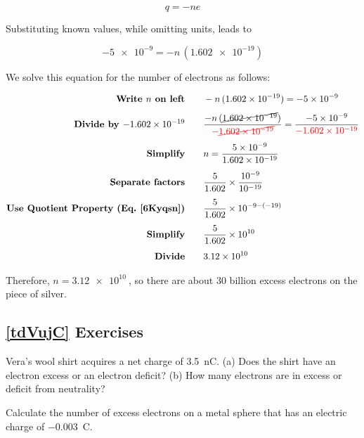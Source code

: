\documentclass[main.tex]{subfiles}
\begin{document}
\begin{equation*}
    q = -ne
\end{equation*}

Substituting known values, while omitting units, leads to

\begin{equation*}
     \num{-5e-9} = - n\,(\num{1.602e-19})
\end{equation*}

We solve this equation for the number of electrons as follows:

\begin{align*}
    \textbf{Write $n$ on left} \qquad & - n\,(\SI{1.602e-19}{}) = \SI{-5e-9}{}\\[1ex]
    \textbf{Divide by \SI{-1.602e-19}{}} \qquad & \frac{- n\,(\cancel{\SI{1.602e-19}{}})}{\mathbin{\color{red} -} \textcolor{red}{\cancel{\SI{1.602e-19}{}}}} = \frac{\SI{-5e-9}{}}{\mathbin{\color{red} -} \textcolor{red}{\SI{1.602e-19}{}}}\\[1ex]
    \textbf{Simplify} \qquad & n = \frac{\qty{5e-9}{}}{\qty{1.602e-19}{}}\\[1ex]
    \textbf{Separate factors} \qquad & \frac{5}{1.602} \times \frac{10^{-9}}{10^{-19}}\\[1ex]
    \textbf{Use Quotient Property (Eq.~\ref{6Kyqsn})} \qquad & \frac{5}{1.602} \times 10^{-9 - (-19)}\\[1ex]
    \textbf{Simplify} \qquad & \frac{5}{1.602} \times 10^{10}\\[1ex]
    \textbf{Divide} \qquad & \SI{3.12e10}{}
\end{align*}

Therefore, $n = \SI{3.12e10}{}$, so there are about 30 billion excess electrons on the piece of silver.

\vspace{1em}
\cyanhrule

\subsection*{\ref{tdVujC} Exercises}

\begin{exercise} \label{994stj}
    Vera's wool shirt acquires a net charge of \SI{3.5}{nC}. (a) Does the shirt have an electron excess or an electron deficit? (b) How many electrons are in excess or deficit from neutrality?
\end{exercise}

\begin{exercise} \label{IRX4Zr}
    Calculate the number of excess electrons on a metal sphere that has an electric charge of \qty{-0.003}{C}.
\end{exercise}
\end{document}
